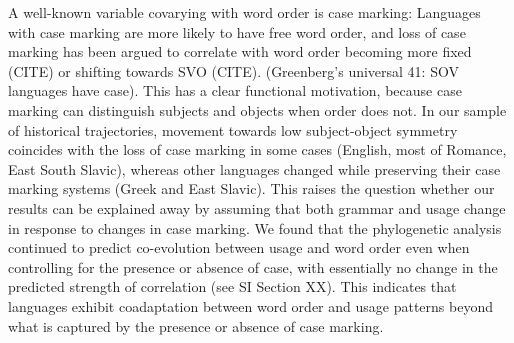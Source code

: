 \documentclass[11pt,a4paper]{article}
\begin{document}
A well-known variable covarying with word order is case marking: Languages with case marking are more likely to have free word order, and loss of case marking has been argued to correlate with word order becoming more fixed (CITE) or shifting towards SVO (CITE). (Greenberg's universal 41: SOV languages have case).
This has a clear functional motivation, because case marking can distinguish subjects and objects when order does not.
In our sample of historical trajectories, movement towards low subject-object symmetry coincides with the loss of case marking in some cases (English, most of Romance, East South Slavic), whereas other languages changed while preserving their case marking systems (Greek and East Slavic).
This raises the question whether our results can be explained away by assuming that both grammar and usage change in response to changes in case marking.
We found that the phylogenetic analysis continued to predict co-evolution between usage and word order even when controlling for the presence or absence of case, with essentially no change in the predicted strength of correlation (see SI Section XX).
This indicates that languages exhibit coadaptation between word order and usage patterns beyond what is captured by the presence or absence of case marking.

\end{document}
